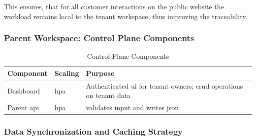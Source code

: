 \documentclass[11pt, a4paper, oneside, listof=totoc]{scrartcl}
\begin{document}
                This ensures, that for all customer interactions on the public website the workload
                remains local to the tenant workspace, thus improving the traceability.
            \subsubsection{Parent Workspace: Control Plane Components}\label{subsubsec:controlPlaneComponents}
                
                \begin{table}[H]\label{tab:parentComponents}
                    \centering
                    \renewcommand{\arraystretch}{1.5}
                    \begin{tabular}{lp{4cm}P{8cm}}
                        \toprule
                        Component & Scaling & Purpose \\
                        \midrule
                        Dashboard & \gls{hpa} & Authenticated \gls{ui} for tenant owners; \gls{crud} operations on tenant data \\
                        Parent \gls{api} & \gls{hpa} & validates input and writes \gls{json} \\
                        \bottomrule
                    \end{tabular}
                    \caption{Control Plane Components}
                \end{table}


            \subsubsection{Data Synchronization and Caching Strategy}\label{syncAndCache}
\end{document}
